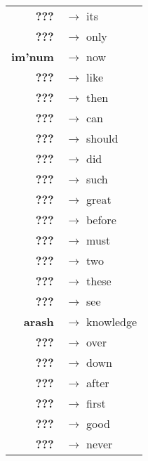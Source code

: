 \begin{tabular}{rl}
\textbf{???} & $\rightarrow$ its \\
\textbf{???} & $\rightarrow$ only \\
\textbf{im'num} & $\rightarrow$ now \\
\textbf{???} & $\rightarrow$ like \\
\textbf{???} & $\rightarrow$ then \\
\textbf{???} & $\rightarrow$ can \\
\textbf{???} & $\rightarrow$ should \\
\textbf{???} & $\rightarrow$ did \\
\textbf{???} & $\rightarrow$ such \\
\textbf{???} & $\rightarrow$ great \\
\textbf{???} & $\rightarrow$ before \\
\textbf{???} & $\rightarrow$ must \\
\textbf{???} & $\rightarrow$ two \\
\textbf{???} & $\rightarrow$ these \\
\textbf{???} & $\rightarrow$ see \\
\textbf{arash} & $\rightarrow$ knowledge \\
\textbf{???} & $\rightarrow$ over \\
\textbf{???} & $\rightarrow$ down \\
\textbf{???} & $\rightarrow$ after \\
\textbf{???} & $\rightarrow$ first \\
\textbf{???} & $\rightarrow$ good \\
\textbf{???} & $\rightarrow$ never \\
\end{tabular}


